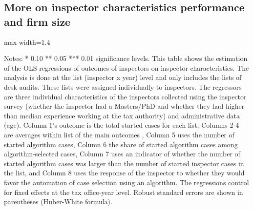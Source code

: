 \documentclass{article}
\newcommand{\OutPath}{Output/}%
\newcommand{\OutPath}{../Output/}%
\begin{document}
\begin{landscape}
\subsection{More on inspector characteristics performance and firm size }
\begin{table}[!htbp]\centering
\begin{adjustbox}{max width=1.4\textwidth}
\begin{threeparttable}
\caption{Inspector Characteristics and firm size, Desk Audits}
\label{tab:inspector_effort_disc_Desk}



\begin{tablenotes}[flushleft]
\footnotesize \item Notes: * 0.10 ** 0.05 *** 0.01 significance levels. This table shows the estimation of the OLS regressions of outcomes of inspectors on inspector characteristics. The analysis is done at the list (inspector x year) level and only includes the lists of desk audits. These lists were assigned individually to inspectors. The regressors are three individual characteristics of the inspectors collected using the inspector survey (whether the inspector had a Masters/PhD and whether they had higher than median experience working at the tax authority) and administrative data (age). Column 1's outcome is the total started cases for each list, Columns 2-4 are averages within list of the main outcomes , Column 5 uses the number of started algorithm cases, Column 6 the share of started algorithm cases among algorithm-selected cases, Column 7 uses an indicator of whether the number of started algorithm cases was larger than the number of started inspector cases in the list, and Column 8 uses the response of the inspector to whether they would favor the automation of case selection using an algorithm. The regressions control for fixed effects at the tax office-year level. Robust standard errors are shown in parentheses (Huber-White formula).
\end{tablenotes}
\end{threeparttable}
\end{adjustbox}
\end{table}
\end{landscape}
\end{document}
